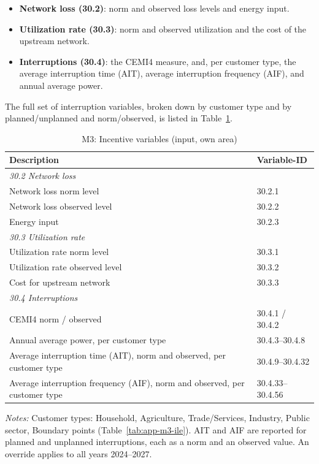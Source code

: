 \begin{itemize}
  \item \textbf{Network loss (30.2)}: norm and observed loss levels and energy input.
  \item \textbf{Utilization rate (30.3)}: norm and observed utilization and the cost of the upstream network.
  \item \textbf{Interruptions (30.4)}: the CEMI4 measure, and, per customer type, the average interruption time (AIT), average interruption frequency (AIF), and annual average power.
\end{itemize}

\noindent The full set of interruption variables, broken down by customer type and by planned/unplanned and norm/observed, is listed in Table~\ref{tab:app-var-m3}.

\begin{table}[H]
\centering
\begin{singlespace}
\footnotesize
\begin{threeparttable}
\caption{M3: Incentive variables (input, own area)}
\label{tab:app-var-m3}
\begin{tabular}{@{}p{10cm}l@{}}
\toprule
\textbf{Description} & \textbf{Variable-ID} \\
\midrule
\multicolumn{2}{l}{\textit{30.2 Network loss}} \\
Network loss norm level & 30.2.1 \\
Network loss observed level & 30.2.2 \\
Energy input & 30.2.3 \\
\midrule
\multicolumn{2}{l}{\textit{30.3 Utilization rate}} \\
Utilization rate norm level & 30.3.1 \\
Utilization rate observed level & 30.3.2 \\
Cost for upstream network & 30.3.3 \\
\midrule
\multicolumn{2}{l}{\textit{30.4 Interruptions}} \\
CEMI4 norm / observed & 30.4.1 / 30.4.2 \\
Annual average power, per customer type & 30.4.3--30.4.8 \\
Average interruption time (AIT), norm and observed, per customer type & 30.4.9--30.4.32 \\
Average interruption frequency (AIF), norm and observed, per customer type & 30.4.33--30.4.56 \\
\bottomrule
\end{tabular}
\begin{tablenotes}
\item \textit{Notes:} Customer types: Household, Agriculture, Trade/Services, Industry, Public sector, Boundary points (Table~\ref{tab:app-m3-ile}). AIT and AIF are reported for planned and unplanned interruptions, each as a norm and an observed value. An override applies to all years 2024--2027.
\end{tablenotes}
\end{threeparttable}
\end{singlespace}
\end{table}


